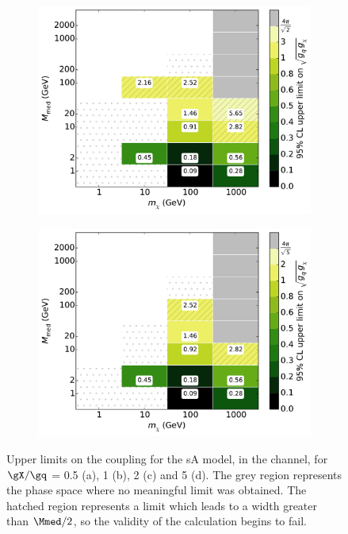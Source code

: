 \begin{figure}[h]
\begin{subfigure}[t]{0.495\textwidth}
      \includegraphics[width=1.\textwidth]{figures/grid_basepoints_SAD_rat2_monoWZ.pdf}
      \caption{}
    \end{subfigure}
    \begin{subfigure}[t]{0.495\textwidth}
      \centering
      \includegraphics[width=1.\textwidth]{figures/grid_basepoints_SAD_rat5_monoWZ.pdf}
      \caption{}
    \end{subfigure}
    \caption{Upper limits on the coupling for the sA model, in the \monoWZ channel, for $\gX / \gq$ = 0.5 (a), 1 (b), 2 (c) and 5 (d). The grey region represents the phase space where no meaningful limit was obtained. The hatched region represents a limit which leads to a width greater than $\Mmed / 2$, so the validity of the calculation begins to fail.}
    \label{fig:MonoWZ_SAD_couplinglimit}
\end{figure}

